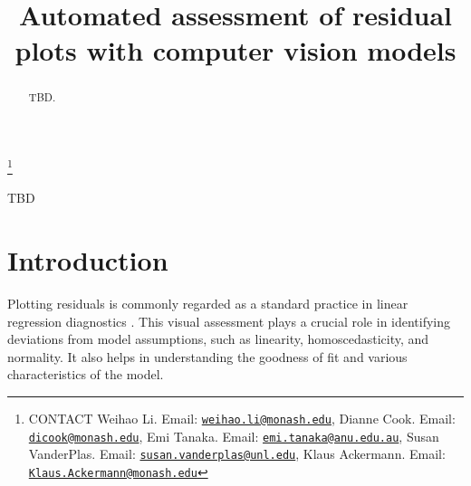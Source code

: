 \documentclass[]{interact}
\theoremstyle{plain}%
\theoremstyle{definition}
\theoremstyle{remark}
\begin{document}

\title{Automated assessment of residual plots with computer vision
models}


\author{
}

\thanks{CONTACT Weihao
Li. Email: \href{mailto:weihao.li@monash.edu}{\nolinkurl{weihao.li@monash.edu}}, Dianne
Cook. Email: \href{mailto:dicook@monash.edu}{\nolinkurl{dicook@monash.edu}}, Emi
Tanaka. Email: \href{mailto:emi.tanaka@anu.edu.au}{\nolinkurl{emi.tanaka@anu.edu.au}}, Susan
VanderPlas. Email: \href{mailto:susan.vanderplas@unl.edu}{\nolinkurl{susan.vanderplas@unl.edu}}, Klaus
Ackermann. Email: \href{mailto:Klaus.Ackermann@monash.edu}{\nolinkurl{Klaus.Ackermann@monash.edu}}}

\maketitle

\begin{abstract}
TBD.
\end{abstract}

\begin{keywords}
TBD
\end{keywords}

\section{Introduction}\label{introduction}

Plotting residuals is commonly regarded as a standard practice in linear
regression diagnostics
\citep[see][]{cook1982residuals, belsley1980regression}. This visual
assessment plays a crucial role in identifying deviations from model
assumptions, such as linearity, homoscedasticity, and normality. It also
helps in understanding the goodness of fit and various characteristics
of the model.
\end{document}
